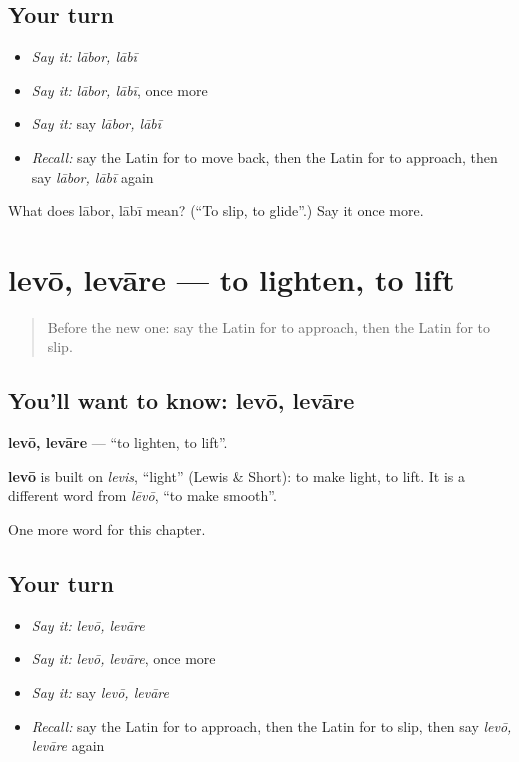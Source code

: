 \subsection*{Your turn}
\begin{itemize}
\raggedright
  \item \emph{Say it:} \emph{lābor, lābī}
  \item \emph{Say it:} \emph{lābor, lābī}, once more
  \item \emph{Say it:} say \emph{lābor, lābī}
  \item \emph{Recall:} say the Latin for to move back, then the Latin for to approach, then say \emph{lābor, lābī} again
\end{itemize}

\begin{tcolorbox}[breakable,colback=teal!4,colframe=teal!35!black,title={Before you move on}]
What does lābor, lābī mean? (\textquotedblleft{}To slip, to glide\textquotedblright{}.) Say it once more.
\end{tcolorbox}
\section[levō, levāre]{levō, levāre — to lighten, to lift}

\label{lesson:LA-C170-levo}



\begin{quote}
Before the new one: say the Latin for to approach, then the Latin for to slip.
\end{quote}

\subsection*{You'll want to know: levō, levāre}
\textbf{levō, levāre} — \textquotedblleft{}to lighten, to lift\textquotedblright{}.

\begin{cousinweb}
\textbf{levō} is built on \emph{levis}, \textquotedblleft{}light\textquotedblright{} (Lewis \& Short): to make light, to lift. It is a different word from \emph{lēvō}, \textquotedblleft{}to make smooth\textquotedblright{}.
\end{cousinweb}

\begin{grammarlens}[title={What you've built}]
One more word for this chapter.
\end{grammarlens}

\subsection*{Your turn}
\begin{itemize}
\raggedright
  \item \emph{Say it:} \emph{levō, levāre}
  \item \emph{Say it:} \emph{levō, levāre}, once more
  \item \emph{Say it:} say \emph{levō, levāre}
  \item \emph{Recall:} say the Latin for to approach, then the Latin for to slip, then say \emph{levō, levāre} again
\end{itemize}

